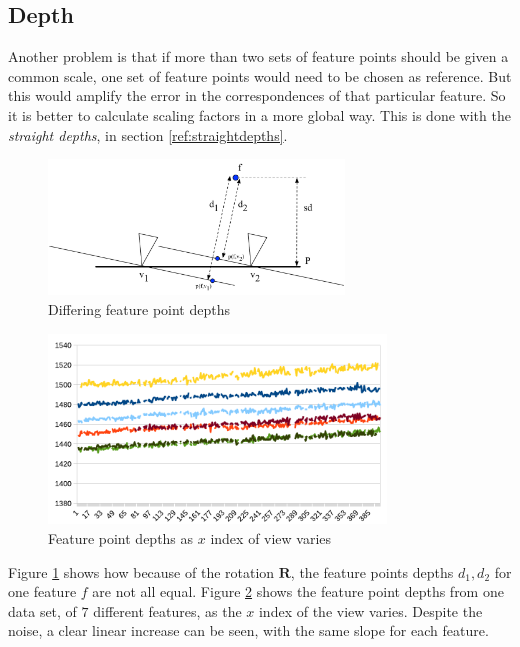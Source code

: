 \documentclass[11pt]{scrreprt}
\newcommand{\matr}[1]{\mathbf{#1}}
\begin{document}
\pagebreak
\subsection{Depth}
Another problem is that if more than two sets of feature points should be given a common scale, one set of feature points would need to be chosen as reference. But this would amplify the error in the correspondences of that particular feature. So it is better to calculate scaling factors in a more global way. This is done with the \emph{straight depths}, in section \ref{ref:straightdepths}.

\begin{figure}[h]
\centering
\includegraphics[width=0.7\textwidth]{differentdepths.pdf}
\caption{Differing feature point depths}
\label{fig:differentdepths}
\end{figure}

\begin{figure}[h]
\centering
\includegraphics[width=0.8\textwidth]{xdepths.pdf}
\caption{Feature point depths as $x$ index of view varies}
\label{fig:xdepths}
\end{figure}

Figure \ref{fig:differentdepths} shows how because of the rotation $\matr{R}$, the feature points depths $d_1, d_2$ for one feature $f$ are not all equal. Figure \ref{fig:xdepths} shows the feature point depths from one data set, of $7$ different features, as the $x$ index of the view varies. Despite the noise, a clear linear increase can be seen, with the same slope for each feature.
\end{document}
